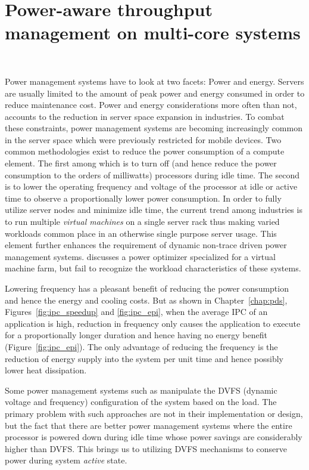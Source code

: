 \chapter{Power-aware throughput management on multi-core systems}~\label{chap:delta}

Power management systems have to look at two facets: Power and energy. Servers are
usually limited to the amount of peak power and energy
consumed in order to reduce maintenance cost. Power and energy considerations more often than not, accounts 
to the reduction in server space expansion in industries. To combat these constraints, power management systems
are becoming increasingly common in the server space which were previously restricted for mobile devices.
Two common methodologies exist to reduce the power consumption of a compute element. The first among which
is to turn off (and hence reduce the power consumption to the orders of milliwatts) processors during idle time. 
The second is to lower the operating frequency and voltage of the processor at idle or active time to observe
a proportionally lower power consumption.
In order to fully utilize server nodes and minimize idle time, the current trend among industries is to 
run multiple \textit{virtual machines} on a single server rack thus making varied workloads common place
in an otherwise single purpose server usage. This element further enhances the requirement of 
dynamic non-trace driven power management systems. \cite{VirtualPower} discusses a power optimizer specialized
for a virtual machine farm, but fail to recognize the workload characteristics of these systems.

Lowering frequency has a pleasant benefit of reducing the power consumption and hence
the energy and cooling costs. But as shown in Chapter~\ref{chap:pds}, Figures~\ref{fig:ipc_speedup} 
and \ref{fig:ipc_epi}, when the average IPC of an application is high, reduction in 
frequency only causes the application to execute for a proportionally longer duration and 
hence having no energy benefit (Figure~\ref{fig:ipc_epi}). The only advantage of reducing
the frequency is the reduction of energy supply into the system per unit time and hence
possibly lower heat dissipation. 

Some power management systems such as \cite{OnDemand} manipulate the DVFS (dynamic voltage and frequency) configuration
of the system based on the load. The primary problem with such approaches are not in
their implementation or design, but the fact that there are better power management
systems where the entire processor is powered down during idle time whose power savings are considerably higher than DVFS. 
This brings us to utilizing DVFS mechanisms to conserve power during system \textit{active}
state. 

